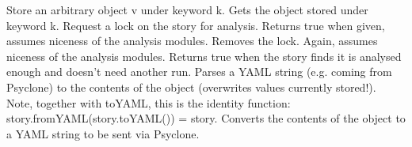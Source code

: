 \begin{interface}
    {Store an arbitrary object v under keyword k.}
    {Gets the object stored under keyword k.}
    {Request a lock on the story for analysis. Returns true when given, assumes
      niceness of the analysis modules.}
    {Removes the lock. Again, assumes niceness of the analysis modules.}
    {Returns true when the story finds it is analysed enough and doesn't need
      another run.}
    {Parses a \ac{YAML} string (e.g. coming from Psyclone) to the contents of the
      object (overwrites values currently stored!). Note, together with toYAML,
      this is the identity function: story.fromYAML(story.toYAML()) = story.}
    {Converts the contents of the object to a \ac{YAML} string to be sent via
      Psyclone.}
\end{interface}

